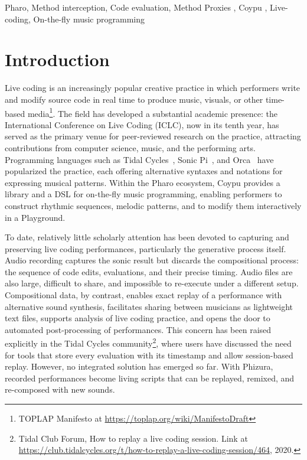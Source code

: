\documentclass[
]{ceurart}
\begin{document}
\begin{keywords}
  Pharo\sep
  Method interception\sep
  Code evaluation\sep 
  Method Proxies \sep
  Coypu \sep
  Live-coding\sep
  On-the-fly music programming
\end{keywords}

\maketitle



\section{Introduction}\label{sec:intro}
Live coding is an increasingly popular creative practice in which performers write and modify source code in real time to produce music, visuals, or other time-based media\footnote{TOPLAP Manifesto at \url{https://toplap.org/wiki/ManifestoDraft}}.
The field has developed a substantial academic presence: the International Conference on Live Coding (ICLC), now in its tenth year, has served as the primary venue for peer-reviewed research on the practice, attracting contributions from computer science, music, and the performing arts.
Programming languages such as Tidal Cycles~\cite{McLe14a}, Sonic Pi~\cite{Aaro16a}, and Orca~\cite{Mess21a} have popularized the practice, each offering alternative syntaxes and notations for expressing musical patterns. Within the Pharo ecosystem, Coypu\cite{Cipr25c} provides a library and a DSL for on-the-fly music programming, enabling performers to construct rhythmic sequences, melodic patterns, and to modify them interactively in a Playground.

To date, relatively little scholarly attention has been devoted to capturing and preserving live coding performances, particularly the generative process itself. Audio recording captures the sonic result but discards the compositional process: the sequence of code edits, evaluations, and their precise timing. Audio files are also large, difficult to share, and impossible to re-execute under a different setup. Compositional data, by contrast, enables exact replay of a performance with alternative sound synthesis, facilitates sharing between musicians as lightweight text files, supports analysis of live coding practice, and opens the door to automated post-processing of performances. This concern has been raised explicitly in the Tidal Cycles community\footnote{Tidal Club Forum, How to replay a live coding session. Link at \url{https://club.tidalcycles.org/t/how-to-replay-a-live-coding-session/464}, 2020.}, where users have discussed the need for tools that store every evaluation with its timestamp and allow session-based replay. However, no integrated solution has emerged so far. With Phizura, recorded performances become living scripts that can be replayed, remixed, and re-composed with new sounds.
\end{document}
